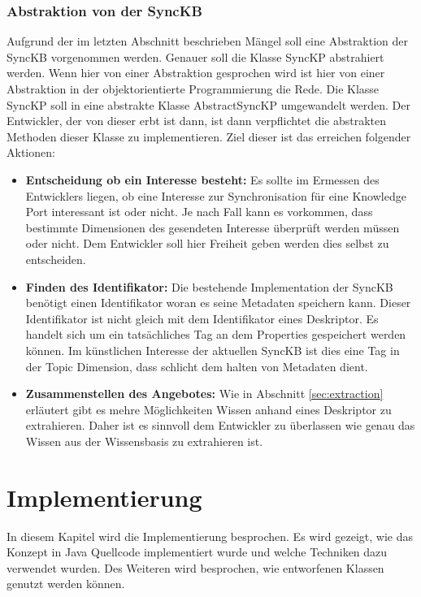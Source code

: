 \documentclass[a4paper]{article}
\begin{document}
	\subsubsection{Abstraktion von der SyncKB}
	
	Aufgrund der im letzten Abschnitt beschrieben Mängel soll eine Abstraktion der
	SyncKB vorgenommen werden. Genauer soll die Klasse SyncKP abstrahiert werden.
	Wenn hier von einer Abstraktion gesprochen wird	ist hier von einer Abstraktion 
	in der objektorientierte Programmierung die Rede. Die Klasse SyncKP soll in
	eine abstrakte Klasse AbstractSyncKP umgewandelt werden. Der Entwickler, der
	von dieser erbt ist dann, ist dann verpflichtet die abstrakten Methoden dieser
	Klasse zu implementieren. Ziel dieser ist das erreichen	folgender Aktionen:
	
	\begin{itemize}
		\item \textbf{Entscheidung ob ein Interesse besteht:} Es sollte im 
		Ermessen des Entwicklers liegen, ob eine Interesse zur Synchronisation
		für eine Knowledge Port interessant ist oder nicht. Je nach Fall kann
		es vorkommen, dass bestimmte Dimensionen des gesendeten Interesse überprüft
		werden müssen oder nicht. Dem Entwickler soll hier Freiheit geben werden
		dies selbst zu entscheiden.
		\item \textbf{Finden des Identifikator:} Die bestehende Implementation der
		SyncKB benötigt einen Identifikator woran es seine Metadaten speichern
		kann. Dieser Identifikator ist nicht gleich mit dem Identifikator eines
		Deskriptor. Es handelt sich um ein tatsächliches Tag an dem Properties
		gespeichert werden können. Im künstlichen Interesse der aktuellen SyncKB
		ist dies eine Tag in der Topic Dimension, dass schlicht dem halten von
		Metadaten dient.
		\item \textbf{Zusammenstellen des Angebotes:} Wie in Abschnitt
		\ref{sec:extraction} erläutert gibt es mehre Möglichkeiten Wissen
		anhand eines Deskriptor zu extrahieren. Daher ist es sinnvoll dem
		Entwickler zu überlassen wie genau das Wissen aus der Wissensbasis zu
		extrahieren ist. 
	\end{itemize} 	
	
	\newpage
	\section{Implementierung}
	
	In diesem Kapitel wird die Implementierung besprochen. Es wird gezeigt, wie
	das Konzept in Java Quellcode implementiert wurde und welche Techniken dazu
	verwendet wurden. Des Weiteren wird besprochen, wie entworfenen Klassen 
	genutzt werden können.
	
\end{document}
